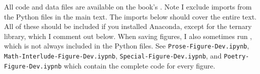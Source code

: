 
\noindent All code and data files are available on the book's . Note I exclude imports from the Python files in the main text. The imports below should cover the entire text. All of these should be included if you installed Anaconda, except for the ternary library, which I comment out below. When saving figures, I also sometimes run , which is not always included in the Python files. See \texttt{Prose-Figure-Dev.ipynb}, \texttt{Math-Interlude-Figure-Dev.iypnb}, \texttt{Special-Figure-Dev.iypnb}, and \texttt{Poetry-Figure-Dev.iypnb} which contain the complete code for every figure.


